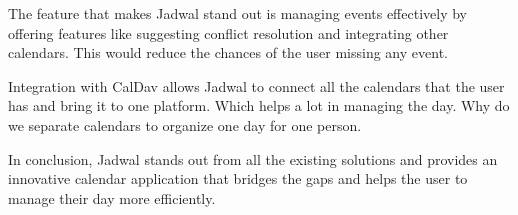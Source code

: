 \documentclass[12pt,a4paper]{report}
\begin{document}
The feature that makes Jadwal stand out is managing events effectively by offering features like suggesting conflict resolution and integrating other calendars. This would reduce the chances of the user missing any event.

Integration with CalDav allows Jadwal to connect all the calendars that the user has and bring it to one platform. Which helps a lot in managing the day. Why do we separate calendars to organize one day for one person.

In conclusion, Jadwal stands out from all the existing solutions and provides an innovative calendar application that bridges the gaps and helps the user to manage their day more efficiently.




\end{document}
